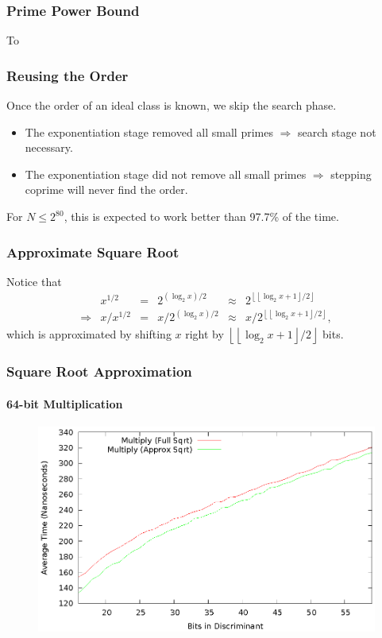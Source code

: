 \documentclass{beamer}
\newcommand{\floor}[1]{\left\lfloor #1 \right\rfloor}
\begin{document}
\begin{frame}
\frametitle{Prime Power Bound}
To 

\end{frame}

\begin{frame}
\frametitle{Reusing the Order}

Once the order of an ideal class is known, we skip the search phase.

\begin{itemize}
\item The exponentiation stage removed all small primes $\Rightarrow$ search stage not necessary.

\item The exponentiation stage did not remove all small primes $\Rightarrow$ stepping coprime will never find the order.
\end{itemize}

For $N \le 2^{80}$, this is expected to work better than 97.7\% of the time.

\end{frame}




\begin{frame}
\frametitle{Approximate Square Root}
Notice that
\begin{equation*}
\begin{array}{rrlrlr}
	& x^{1/2} &=& 2^{(\log_2x)/2} &\approx& 2^{\floor{\floor{\log_2x+1}/2}} \\
	\Rightarrow & x / x^{1/2} &=& x / 2^{(\log_2x)/2} &\approx& x / 2^{\floor{\floor{\log_2x+1}/2}},
\end{array}
\end{equation*}
which is approximated by shifting $x$ right by $\floor{\floor{\log_2x+1}/2}$ bits.
\end{frame}

\begin{frame}
\frametitle{Square Root Approximation}
\framesubtitle{64-bit Multiplication}
\begin{figure}
\includegraphics[scale=0.86]{compose-sqrtopt-64}
\end{figure}
\end{frame}
\end{document}
